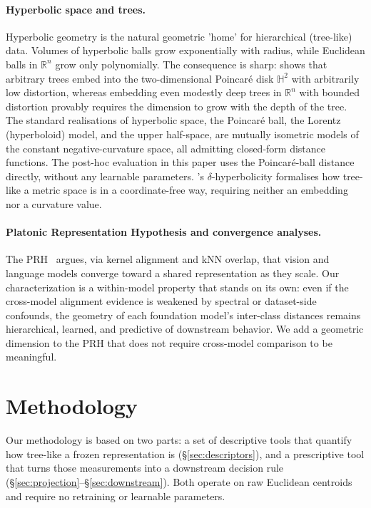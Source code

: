 \documentclass{article}
\begin{document}
\paragraph{Hyperbolic space and trees.} Hyperbolic geometry is the natural geometric 'home' for hierarchical (tree-like) data. Volumes of hyperbolic balls grow exponentially with radius, while Euclidean balls in $\mathbb{R}^n$ grow only polynomially. The consequence is sharp: \citet{sarkar2011low} shows that arbitrary trees embed into the two-dimensional Poincar\'{e} disk $\mathbb{H}^2$ with arbitrarily low distortion, whereas embedding even modestly deep trees in $\mathbb{R}^n$ with bounded distortion provably requires the dimension to grow with the depth of the tree. The standard realisations of hyperbolic space, the Poincar\'{e} ball, the Lorentz (hyperboloid) model, and the upper half-space, are mutually isometric models of the constant negative-curvature space, all admitting closed-form distance functions. The post-hoc evaluation in this paper uses the Poincar\'{e}-ball distance directly, without any learnable parameters. \citet{Gromov1987}'s $\delta$-hyperbolicity formalises how tree-like a metric space is in a coordinate-free way, requiring neither an embedding nor a curvature value. %



\paragraph{Platonic Representation Hypothesis and convergence analyses.} The PRH~\citep{huh2024platonic} argues, via kernel alignment and kNN overlap, that vision and language models converge toward a shared representation as they scale. Our characterization is a within-model property that stands on its own: even if the cross-model alignment evidence is weakened by spectral or dataset-side confounds, the geometry of each foundation model's inter-class distances remains hierarchical, learned, and predictive of downstream behavior. We add a geometric dimension to the PRH that does not require cross-model comparison to be meaningful.



\section{Methodology}
\label{sec:method}

Our methodology is based on two parts: a set of descriptive tools that quantify how tree-like a frozen representation is (\S\ref{sec:descriptors}), and a prescriptive tool that turns those measurements into a downstream decision rule (\S\ref{sec:projection}--\S\ref{sec:downstream}). Both operate on raw Euclidean centroids and require no retraining or learnable parameters.
\end{document}
